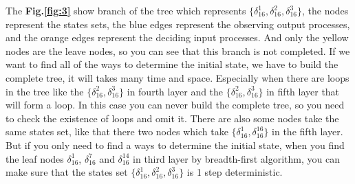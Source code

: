 \documentclass[letterpaper, 10 pt, conference]{ieeeconf}  %
\begin{document}
The {\bf Fig.\ref{fig:3}} show branch of the tree which represents $\{\delta_{16}^1,\delta_{16}^2,\delta_{16}^3\}$, the nodes represent the states sets, the blue edges represent the observing output processes, and the orange edges represent the deciding input processes. And only the yellow nodes are the leave nodes, so you can see that this branch is not completed. If we want to find all of the ways to determine the initial state, we have to build the complete tree, it will takes many time and space. Especially when there are loops in the tree like the $\{\delta_{16}^2,\delta_{16}^3\}$ in fourth layer and the $\{\delta_{16}^2,\delta_{16}^3\}$ in fifth layer that will form a loop. In this case you can never build the complete tree, so you need to check the existence of loops and omit it. There are also some nodes take the same states set, like that there two nodes which take $\{\delta_{16}^1,\delta_{16}^{16}\}$ in the fifth layer. But if you only need to find a ways to determine the initial state, when you find the leaf nodes $\delta_{16}^1$, $\delta_{16}^7$ and  $\delta_{16}^{14}$ in third layer by breadth-first algorithm, you can make sure that the states set $\{\delta_{16}^1,\delta_{16}^2,\delta_{16}^3\}$ is 1 step deterministic.  
\end{document}
